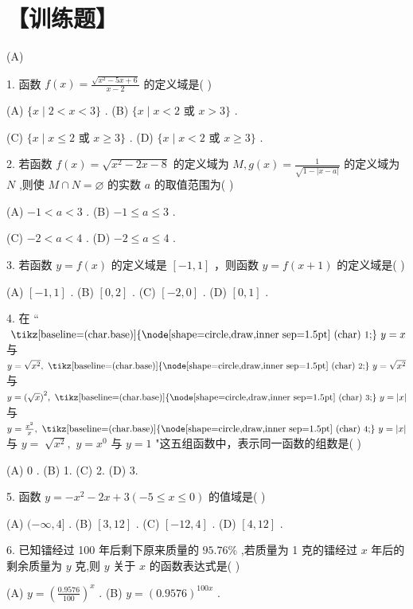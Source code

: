 \documentclass[10pt]{article}
\newcommand*\circled[1]{\tikz[baseline=(char.base)]{\node[shape=circle,draw,inner sep=1.5pt] (char) {\small #1};}}
\begin{document}
\section*{【训练题】}

(A)

1. 函数 \(f\left( x\right)  = \frac{\sqrt{{x}^{2} - {5x} + 6}}{x - 2}\) 的定义域是( )

(A) \(\{ x \mid  2 < x < 3\}\) . (B) \(\{ x \mid  x < 2\) 或 \(x > 3\}\) .

(C) \(\{ x \mid  x \leq  2\) 或 \(x \geq  3\}\) . (D) \(\{ x \mid  x < 2\) 或 \(x \geq  3\}\) .

2. 若函数 \(f\left( x\right)  = \sqrt{{x}^{2} - {2x} - 8}\) 的定义域为 \(M,g\left( x\right)  = \frac{1}{\sqrt{1 - \left| {x - a}\right| }}\) 的定义域为 \(N\) ,则使 \(M \cap  N = \varnothing\) 的实数 \(a\) 的取值范围为( )

(A) \(- 1 < a < 3\) . (B) \(- 1 \leq  a \leq  3\) .

(C) \(- 2 < a < 4\) . (D) \(- 2 \leq  a \leq  4\) .

3. 若函数 \(y = f\left( x\right)\) 的定义域是 \(\left\lbrack  {-1,1}\right\rbrack\) ，则函数 \(y = f\left( {x + 1}\right)\) 的定义域是( )

(A) \(\left\lbrack  {-1,1}\right\rbrack\) . (B) \(\left\lbrack  {0,2}\right\rbrack\) . (C) \(\left\lbrack  {-2,0}\right\rbrack\) . (D) \(\left\lbrack  {0,1}\right\rbrack\) .

4. 在 “ \(\text{  \circled{1}  }y = x\) 与 \(y = \sqrt{{x}^{2}},\text{  \circled{2}  }y = \sqrt{{x}^{2}}\) 与 \(y = {\left( \sqrt{x}\right) }^{2},\text{  \circled{3}  }y = \left| x\right|\) 与 \(y = \frac{{x}^{2}}{x},\text{  \circled{4}  }y = \left| x\right|\) 与 \(y = \; \sqrt{{x}^{2}},\)  \circled{5}  \(y = {x}^{0}\) 与 \(y = 1\) "这五组函数中，表示同一函数的组数是( )

(A) 0 . (B) 1. (C) 2. (D) 3.

5. 函数 \(y =  - {x}^{2} - {2x} + 3\left( {-5 \leq  x \leq  0}\right)\) 的值域是( )

(A) \(( - \infty ,4\rbrack\) . (B) \(\left\lbrack  {3,{12}}\right\rbrack\) . (C) \(\left\lbrack  {-{12},4}\right\rbrack\) . (D) \(\left\lbrack  {4,{12}}\right\rbrack\) .

6. 已知镭经过 100 年后剩下原来质量的 \({95.76}\%\) ,若质量为 1 克的镭经过 \(x\) 年后的剩余质量为 \(y\) 克,则 \(y\) 关于 \(x\) 的函数表达式是( )

(A) \(y = {\left( \frac{0.9576}{100}\right) }^{x}\) . (B) \(y = {\left( {0.9576}\right) }^{100x}\) .
\end{document}
